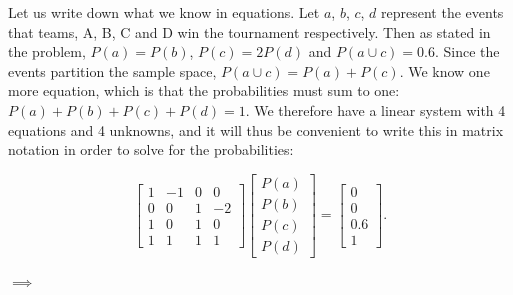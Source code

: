 \begin{problem}{17} Let us write down what we know in equations.  Let $a$, $b$, $c$, $d$ represent the events that teams, A, B, C and D win the tournament respectively.  Then as stated in the problem, $P(a) = P(b)$, $P(c)=2P(d)$ and $P(a \cup c)=0.6$.  Since the events partition the sample space, $P(a \cup c)=P(a)+P(c)$.  We know one more equation, which is that the probabilities must sum to one: $P(a)+P(b)+P(c)+P(d)=1$.  We therefore have a linear system with 4 equations and 4 unknowns, and it will thus be convenient to write this in matrix notation in order to solve for the probabilities:

	\begin{equation*}
		  \begin{bmatrix}
			1 &-1&0&0\\
			0&0&1&-2 \\
			1&0&1&0 \\
			1&1&1&1
		  \end{bmatrix}
 		 \begin{bmatrix}
			P(a)\\
			P(b)\\
			P(c)\\
			P(d)
		  \end{bmatrix}
		  =
		  \begin{bmatrix}
			0 \\
			0 \\
			0.6 \\
			1
		  \end{bmatrix}.
	\end{equation*}
	
$\implies$
	

\end{problem}
